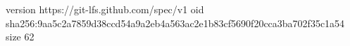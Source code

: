version https://git-lfs.github.com/spec/v1
oid sha256:9aa5c2a7859d38ccd54a9a2eb4a563ac2e1b83cf5690f20cca3ba702f35c1a54
size 62
